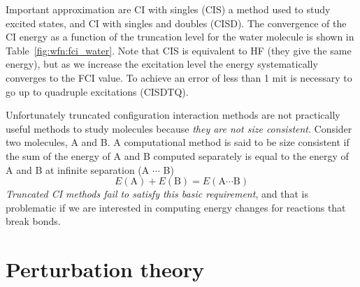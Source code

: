 \documentclass[../Main/chem371-notes.tex]{subfiles}
\begin{document}
Important approximation are CI with singles (CIS) a method used to study excited states, and CI with singles and doubles (CISD).
The convergence of the CI energy as a function of the truncation level for the water molecule is shown in Table~\ref{fig:wfn:fci_water}.
Note that CIS is equivalent to HF (they give the same energy), but as we increase the excitation level the energy systematically converges to the FCI value.
To achieve an error of less than 1 m\Eh it is necessary to go up to quadruple excitations (CISDTQ).


Unfortunately truncated configuration interaction methods are not practically useful methods to study molecules because \emph{they are not size consistent}.
Consider two molecules, A and B.
A computational method is said to be size consistent if the sum of the energy of A and B computed separately is equal to the energy of A and B at infinite separation (A $\cdots$ B)
\begin{equation}
\label{eq:wfn:size_consistency}
E(\text{A}) + E(\text{B}) = E(\text{A} \cdots \text{B}) 
\end{equation}
\emph{Truncated CI methods fail to satisfy this basic requirement}, and that is problematic if we are interested in computing energy changes for reactions that break bonds.

\section{Perturbation theory}
\end{document}

